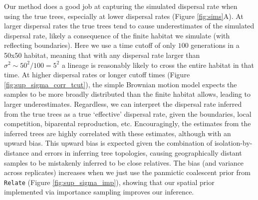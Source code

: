 \documentclass[12pt]{article}
\begin{document}
Our method does a good job at capturing the simulated dispersal rate when using the true trees, especially at lower dispersal rates (Figure \ref{fig:sims}A). 
At larger dispersal rates the true trees tend to cause underestimates of the simulated dispersal rate, likely a consequence of the finite habitat we simulate (with reflecting boundaries). 
Here we use a time cutoff of only $100$ generations in a 50x50 habitat, meaning that with any dispersal rate larger than $\sigma^2 \sim 50^2/100 = 5^2$ a lineage is reasonably likely to cross the entire habitat in that time.
At higher dispersal rates or longer cutoff times (Figure \ref{fig:sup_sigma_corr_tcut}), the simple Brownian motion model expects the samples to be more broadly distributed than the finite habitat allows, leading to larger underestimates.
Regardless, we can interpret the dispersal rate inferred from the true trees as a true `effective' dispersal rate, given the boundaries, local competition, biparental reproduction, etc. 
Encouragingly, the estimates from the inferred trees are highly correlated with these estimates, although with an upward bias.
This upward bias is expected given the combination of isolation-by-distance and errors in inferring tree topologies, causing geographically distant samples to be mistakenly inferred to be close relatives.
The bias (and variance across replicates) increases when we just use the panmictic coalescent prior from \texttt{Relate} (Figure \ref{fig:sup_sigma_imp}), showing that our spatial prior implemented via importance sampling improves our inference.

\end{document}
